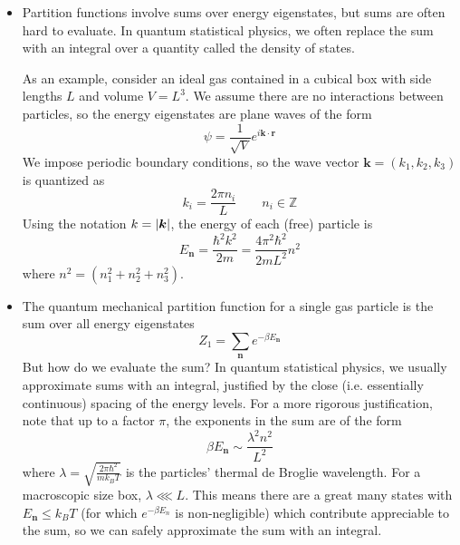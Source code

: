 \documentclass[11pt, a4paper]{article}
\begin{document}
\begin{itemize}
	\item Partition functions involve sums over energy eigenstates, but sums are often hard to evaluate. In quantum statistical physics, we often replace the sum with an integral over a quantity called the density of states. 
	
	As an example, consider an ideal gas contained in a cubical box with side lengths $ L $ and volume $ V = L^{3}$. We assume there are no interactions between particles, so the energy eigenstates are plane waves of the form
	\begin{equation*}
		\psi = \frac{1}{\sqrt{V}}e^{i\bm{k}\cdot \bm{r}}
	\end{equation*}
	We impose periodic boundary conditions, so the wave vector $ \bm{k} = (k_{1}, k_{2}, k_{3}) $  is quantized as
	\begin{equation*}
		k_{i} = \frac{2\pi n_{i}}{L} \qquad n_{i} \in \mathbb{Z}
	\end{equation*}
	Using the notation $ k = \abs{\bm{k}} $, the energy of each (free) particle is
	\begin{equation*}
		E_{\bm{n}} = \frac{\hbar^{2}k^{2}}{2m} = \frac{4\pi^{2}\hbar^{2}}{2mL^{2}}n^{2}
	\end{equation*}
	where $ n^{2} = (n_{1}^{2} + n_{2}^{2} + n_{3}^{2}) $.
	
	\item The quantum mechanical partition function for a single gas particle is the sum over all energy eigenstates
	\begin{equation*}
		Z_{1} = \sum_{\bm{n}}e^{-\beta E_{\bm{n}}}
	\end{equation*}
	But how do we evaluate the sum? In quantum statistical physics, we usually approximate sums with an integral, justified by the close (i.e. essentially continuous) spacing of the energy levels. For a more rigorous justification, note that up to a factor $ \pi $, the exponents in the sum are of the form 
	\begin{equation*}
		\beta E_{\bm{n}} \sim \frac{\lambda^{2}n^{2}}{L^{2}}
	\end{equation*}
	where $ \lambda = \sqrt{\frac{2\pi \hbar^{2}}{mk_{B}T}} $ is the particles' thermal de Broglie wavelength. For a macroscopic size box, $ \lambda \lll L $. This means there are a great many states with $ E_{\bm{n}} \leq k_{B}T $ (for which $ e^{-\beta E_{n}} $ is non-negligible) which contribute appreciable to the sum, so we can safely approximate the sum with an integral. 
	

\end{itemize}
\end{document}
